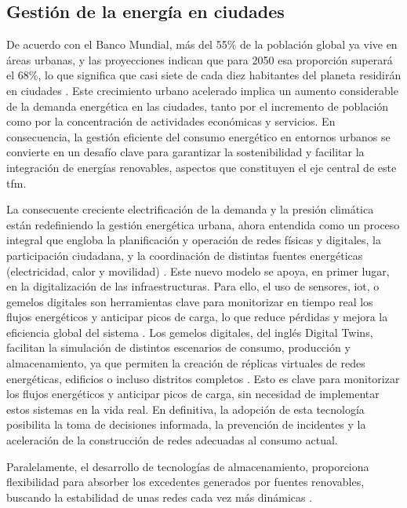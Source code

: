\documentclass[11pt,a4paper]{book}
\begin{document}
\subsection{Gestión de la energía en ciudades}
De acuerdo con el Banco Mundial, más del 55\% de la población global ya vive en áreas urbanas, y las proyecciones indican que para 2050 esa proporción superará el 68\%, lo que significa que casi siete de cada diez habitantes del planeta residirán en ciudades \cite{restrepo2024}. Este crecimiento urbano acelerado implica un aumento considerable de la demanda energética en las ciudades, tanto por el incremento de población como por la concentración de actividades económicas y servicios. En consecuencia, la gestión eficiente del consumo energético en entornos urbanos se convierte en un desafío clave para garantizar la sostenibilidad y facilitar la integración de energías renovables, aspectos que constituyen el eje central de este \gls{tfm}.

La consecuente creciente electrificación de la demanda y la presión climática están redefiniendo la gestión energética urbana, ahora entendida como un proceso integral que engloba la planificación y operación de redes físicas y digitales, la participación ciudadana, y la coordinación de distintas fuentes energéticas (electricidad, calor y movilidad) \cite{cuerva2025}. Este nuevo modelo se apoya, en primer lugar, en la digitalización de las infraestructuras. Para ello, el uso de sensores, \gls{iot}, o gemelos digitales son herramientas clave para monitorizar en tiempo real los flujos energéticos y anticipar picos de carga, lo que reduce pérdidas y mejora la eficiencia global del sistema \cite{valgrai2025}. Los gemelos digitales, del inglés Digital Twins, facilitan la simulación de distintos escenarios de consumo, producción y almacenamiento, ya que permiten la creación de réplicas virtuales de redes energéticas, edificios o incluso distritos completos \cite{Grieves2017, Kalaida2024}. Esto es clave para monitorizar los flujos energéticos y anticipar picos de carga, sin necesidad de implementar estos sistemas en la vida real. En definitiva, la adopción de esta tecnología posibilita la toma de decisiones informada, la prevención de incidentes y la aceleración de la construcción de redes adecuadas al consumo actual.

Paralelamente, el desarrollo de tecnologías de almacenamiento, proporciona flexibilidad para absorber los excedentes generados por fuentes renovables, buscando la estabilidad de unas redes cada vez más dinámicas \cite{enertic2025}.
\end{document}
